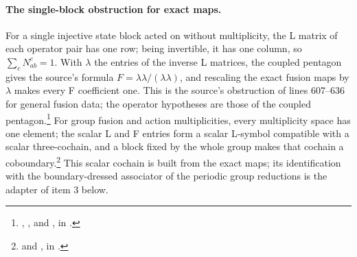 \documentclass{article}
\begin{document}
\paragraph{The single-block obstruction for exact maps.}
For a single injective state block acted on without multiplicity, the L
matrix of each operator pair has one row; being invertible, it has one
column, so $\sum_cN_{ab}^c=1$. With $\lambda$ the entries of the inverse L
matrices, the coupled pentagon gives the source's formula
$F=\lambda\lambda/(\lambda\lambda)$, and rescaling the exact fusion maps
by $\lambda$ makes every F coefficient one. This is the source's
obstruction of lines 607--636 for general fusion data; the operator
hypotheses are those of the coupled pentagon.\footnote{
    ,
    , and
    , in
    .}
For group fusion and action multiplicities, every multiplicity space has
one element; the scalar L and F entries form a scalar L-symbol compatible
with a scalar three-cochain, and a block fixed by the whole group makes
that cochain a coboundary.\footnote{
     and
    , in
    .}
This scalar cochain is built from the exact maps; its identification with
the boundary-dressed associator of the periodic group reductions is the
adapter of item 3 below.
\end{document}
